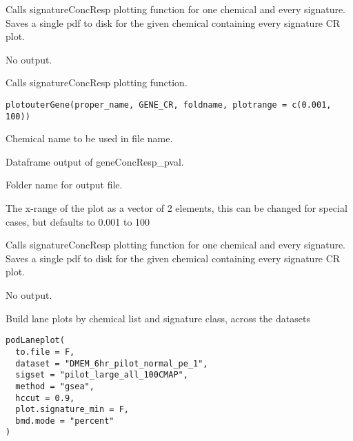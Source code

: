 \documentclass[letterpaper]{book}
\begin{document}
%
\begin{Details}\relax
Calls signatureConcResp plotting function for one chemical and every signature.
Saves a single pdf to disk for the given chemical containing every signature
CR plot.
\end{Details}
%
\begin{Value}
No output.
\end{Value}
%
\begin{Description}\relax
Calls signatureConcResp plotting function.
\end{Description}
%
\begin{Usage}
\begin{verbatim}
plotouterGene(proper_name, GENE_CR, foldname, plotrange = c(0.001, 100))
\end{verbatim}
\end{Usage}
%
\begin{Arguments}
\begin{ldescription}
\item[\code{proper\_name}] Chemical name to be used in file name.

\item[\code{GENE\_CR}] Dataframe output of geneConcResp\_pval.

\item[\code{foldname}] Folder name for output file.

\item[\code{plotrange}] The x-range of the plot as a vector of 2 elements, this can be changed for special cases, but defaults to 0.001 to 100
\end{ldescription}
\end{Arguments}
%
\begin{Details}\relax
Calls signatureConcResp plotting function for one chemical and every signature.
Saves a single pdf to disk for the given chemical containing every signature
CR plot.
\end{Details}
%
\begin{Value}
No output.
\end{Value}
%
\begin{Description}\relax
Build lane plots by chemical list and signature class, across the datasets
\end{Description}
%
\begin{Usage}
\begin{verbatim}
podLaneplot(
  to.file = F,
  dataset = "DMEM_6hr_pilot_normal_pe_1",
  sigset = "pilot_large_all_100CMAP",
  method = "gsea",
  hccut = 0.9,
  plot.signature_min = F,
  bmd.mode = "percent"
)
\end{verbatim}
\end{Usage}
\end{document}
